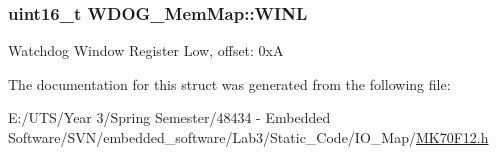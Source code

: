 \subsubsection[{W\+I\+N\+L}]{\setlength{\rightskip}{0pt plus 5cm}uint16\+\_\+t W\+D\+O\+G\+\_\+\+Mem\+Map\+::\+W\+I\+N\+L}\label{struct_w_d_o_g___mem_map_af238938251c1f5904a215c8a4ed1b74d}
Watchdog Window Register Low, offset\+: 0x\+A 

The documentation for this struct was generated from the following file\+:\begin{DoxyCompactItemize}
\item 
E\+:/\+U\+T\+S/\+Year 3/\+Spring Semester/48434 -\/ Embedded Software/\+S\+V\+N/embedded\+\_\+software/\+Lab3/\+Static\+\_\+\+Code/\+I\+O\+\_\+\+Map/\hyperlink{_m_k70_f12_8h}{M\+K70\+F12.\+h}\end{DoxyCompactItemize}

